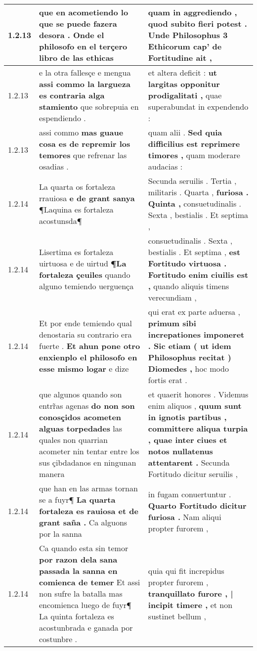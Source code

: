 \begin{tabular}{|p{1cm}|p{6.5cm}|p{6.5cm}|}
1.2.13 & que en acometiendo \textbf{ lo que se puede fazera desora . } Onde el philosofo en el terçero libro de las ethicas & quam in aggrediendo , \textbf{ quod subito fieri potest . } Unde Philosophus 3 Ethicorum cap’ de Fortitudine ait , \\\hline
1.2.13 & e la otra fallesçe e mengua \textbf{ assi commo la largueza es contraria alga stamiento } que sobrepuia en espendiendo . & et altera deficit : \textbf{ ut largitas opponitur prodigalitati , } quae superabundat in expendendo : \\\hline
1.2.13 & assi commo \textbf{ mas guaue cosa es de repremir los temores } que refrenar las osadias . & quam alii . \textbf{ Sed quia difficilius est reprimere timores , } quam moderare audacias : \\\hline
1.2.14 & La quarta os fortaleza rrauiosa \textbf{ e de grant sanya } ¶Laquina es fortaleza acostunsda¶ & Secunda seruilis . Tertia , militaris . Quarta , \textbf{ furiosa . Quinta , } consuetudinalis . Sexta , bestialis . Et septima , \\\hline
1.2.14 & Lisertima es fortaleza uirtuosa e de uirtud \textbf{ ¶La fortaleza çeuiles } quando alguno temiendo uerguença & consuetudinalis . Sexta , bestialis . Et septima , \textbf{ est Fortitudo virtuosa . Fortitudo enim ciuilis est , } quando aliquis timens verecundiam , \\\hline
1.2.14 & Et por ende temiendo qual denostaria su contrario era fuerte . \textbf{ Et ahun pone otro enxienplo el philosofo en esse mismo logar } e dize & qui erat ex parte aduersa , \textbf{ primum sibi increpationes imponeret . Sic etiam ( ut idem Philosophus recitat ) Diomedes , } hoc modo fortis erat . \\\hline
1.2.14 & que algunos quando son entrr̃as agenas \textbf{ do non son conosçidos acometen alguas torpedades } las quales non quarrian acometer nin tentar entre los sus çibdadanos en ningunan manera & et quaerit honores . Videmus enim aliquos , \textbf{ quum sunt in ignotis partibus , committere aliqua turpia , quae inter ciues et notos nullatenus attentarent . } Secunda Fortitudo dicitur seruilis , \\\hline
1.2.14 & que han en las armas tornan se a fuyr¶ \textbf{ La quarta fortaleza es rauiosa et de grant saña . } Ca alguons por la sanna & in fugam conuertuntur . \textbf{ Quarto Fortitudo dicitur furiosa . } Nam aliqui propter furorem , \\\hline
1.2.14 & Ca quando esta sin temor \textbf{ por razon dela sana passada la sanna en comienca de temer } Et assi non sufre la batalla mas encomienca luego de fuyr¶ La quinta fortaleza es acostunbrada e ganada por costunbre . & quia qui fit increpidus propter furorem , \textbf{ tranquillato furore , | incipit timere , } et non sustinet bellum , \\\hline

\end{tabular}
